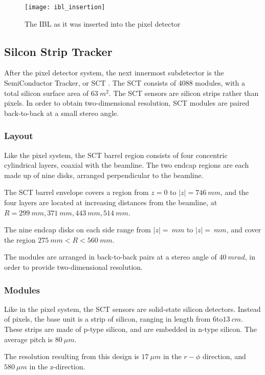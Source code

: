 \begin{figure}[h]
\texttt{[image: ibl\_insertion]}
\caption{The IBL as it was inserted into the pixel detector}
\label{fig:ibl_insertion}\cite{ibl-website}
\end{figure}

\subsection{Silcon Strip Tracker}\label{subsec:sct}

After the pixel detector system, the next innermost subdetector is the SemiConductor Tracker, or SCT .
The SCT consists of 4088 modules, with a total silicon surface area of $63~m^2$.\cite{atlas-detector-2008}
The SCT sensors are silicon strips rather than pixels.
In order to obtain two-dimensional resolution, SCT modules are paired back-to-back at a small stereo angle.

\subsubsection{Layout}
Like the pixel system, the SCT barrel region consists of four concentric cylindrical layers, coaxial with the beamline.
The two endcap regions are each made up of nine disks, arranged perpendicular to the beamline.

The SCT barrel envelope covers a region from $z = 0$ to $|z|  = 746~mm$,
and the four layers are located at increasing distances from the beamline,
at $R = 299~mm, 371~mm, 443~mm, 514~mm$.\cite{sct-barrel-2006}

The nine endcap disks on each side range from $|z| = ~mm$ to $|z| = ~mm$,
and cover the region $275~mm < R < 560~mm$.\cite{atlas-detector-2008}

The modules are arranged in back-to-back pairs at a stereo angle of $40~mrad$, in order to provide two-dimensional resolution.

\subsubsection{Modules}
Like in the pixel system, the SCT sensors are solid-state silicon detectors.
Instead of pixels, the base unit is a strip of silicon, ranging in length from $6 \text{to} 13~cm$.
These strips are made of p-type silicon, and are embedded in n-type silicon. The average pitch is $80~\mu m$.\cite{sct-2008}

The resolution resulting from this design is $17~\mu m$ in the $r-\phi$ direction, and $580~\mu m$ in the z-direction.\cite{sct-2008}

